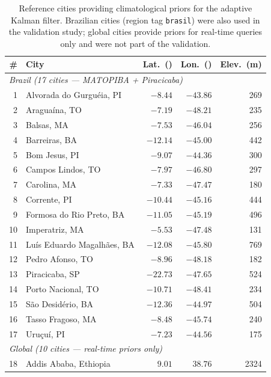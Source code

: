 \documentclass[preprint,review,12pt]{elsarticle}
\begin{document}
\begin{table}[htbp]
\centering
\caption{Reference cities providing climatological priors for the adaptive
Kalman filter. Brazilian cities (region tag \texttt{brasil}) were also used
in the validation study; global cities provide priors for real-time queries
only and were not part of the validation.}
\label{tab:ref_cities}
\small
\begin{tabular}{@{}rlrrr@{}}
\toprule
\# & City & Lat.\ (\textdegree{}) & Lon.\ (\textdegree{}) & Elev.\ (m) \\
\midrule
\multicolumn{5}{l}{\textit{Brazil (17 cities --- MATOPIBA + Piracicaba)}} \\
1  & Alvorada do Gurgu\'eia, PI & $-8.44$ & $-43.86$ & 269 \\
2  & Aragua\'ina, TO            & $-7.19$ & $-48.21$ & 235 \\
3  & Balsas, MA                 & $-7.53$ & $-46.04$ & 256 \\
4  & Barreiras, BA              & $-12.14$ & $-45.00$ & 442 \\
5  & Bom Jesus, PI              & $-9.07$ & $-44.36$ & 300 \\
6  & Campos Lindos, TO          & $-7.97$ & $-46.80$ & 297 \\
7  & Carolina, MA               & $-7.33$ & $-47.47$ & 180 \\
8  & Corrente, PI               & $-10.44$ & $-45.16$ & 444 \\
9  & Formosa do Rio Preto, BA   & $-11.05$ & $-45.19$ & 496 \\
10 & Imperatriz, MA             & $-5.53$ & $-47.48$ & 131 \\
11 & Lu\'is Eduardo Magalh\~aes, BA & $-12.08$ & $-45.80$ & 769 \\
12 & Pedro Afonso, TO           & $-8.96$ & $-48.18$ & 182 \\
13 & Piracicaba, SP             & $-22.73$ & $-47.65$ & 524 \\
14 & Porto Nacional, TO         & $-10.71$ & $-48.41$ & 234 \\
15 & S\~ao Desid\'erio, BA      & $-12.36$ & $-44.97$ & 504 \\
16 & Tasso Fragoso, MA          & $-8.48$ & $-45.74$ & 240 \\
17 & Uru\c{c}u\'i, PI           & $-7.23$ & $-44.56$ & 175 \\
\midrule
\multicolumn{5}{l}{\textit{Global (10 cities --- real-time priors only)}} \\
18 & Addis Ababa, Ethiopia      &  $9.01$ &  $38.76$ & 2324 \\

\end{tabular}
\end{table}
\end{document}
